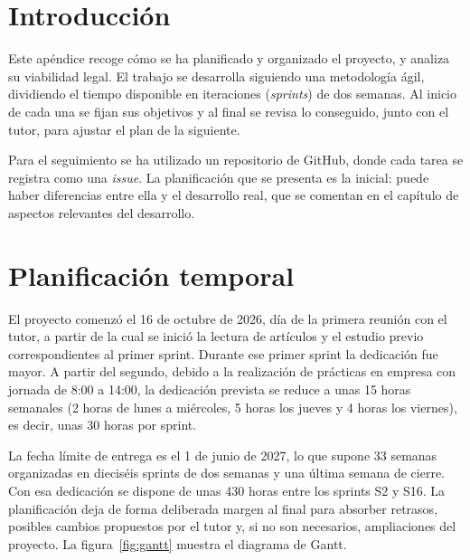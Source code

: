 
\section{Introducción}


Este apéndice recoge cómo se ha planificado y organizado el proyecto, y analiza su viabilidad legal. El trabajo se desarrolla siguiendo una metodología ágil, dividiendo el tiempo disponible en iteraciones (\textit{sprints}) de dos semanas. Al inicio de cada una se fijan sus objetivos y al final se revisa lo conseguido, junto con el tutor, para ajustar el plan de la siguiente.

Para el seguimiento se ha utilizado un repositorio de GitHub, donde cada tarea se registra como una \textit{issue}. La planificación que se presenta es la inicial: puede haber diferencias entre ella y el desarrollo real, que se comentan en el capítulo de aspectos relevantes del desarrollo.

\section{Planificación temporal}

El proyecto comenzó el 16 de octubre de 2026, día de la primera reunión con el tutor, a partir de la cual se inició la lectura de artículos y el estudio previo correspondientes al primer sprint. Durante ese primer sprint la dedicación fue mayor. A partir del segundo, debido a la realización de prácticas en empresa con jornada de 8:00 a 14:00, la dedicación prevista se reduce a unas 15 horas semanales (2 horas de lunes a miércoles, 5 horas los jueves y 4 horas los viernes), es decir, unas 30 horas por sprint.

La fecha límite de entrega es el 1 de junio de 2027, lo que supone 33 semanas organizadas en dieciséis sprints de dos semanas y una última semana de cierre. Con esa dedicación se dispone de unas 430 horas entre los sprints S2 y S16. La planificación deja de forma deliberada margen al final para absorber retrasos, posibles cambios propuestos por el tutor y, si no son necesarios, ampliaciones del proyecto. La figura~\ref{fig:gantt} muestra el diagrama de Gantt.


